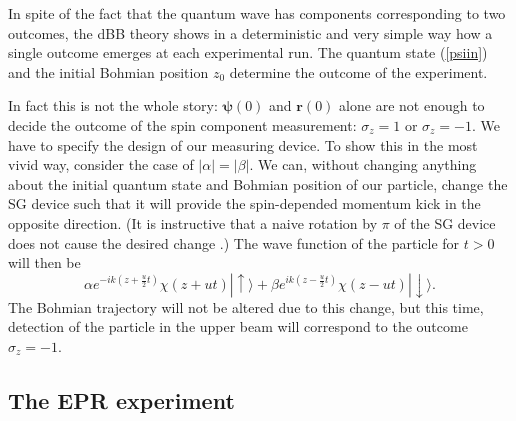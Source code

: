 \documentclass[preprint,tightenlines]{elsarticle}
\begin{document}
In spite of the fact that the quantum wave has components corresponding
to two outcomes, the dBB theory shows in a deterministic and very
simple way how a single outcome emerges at each experimental run.
The quantum state (\ref{psiin}) and the initial Bohmian position
$z_{0}$ determine the outcome of the experiment.

In fact this is not the whole story: $\boldsymbol{\psi}(0)$ and $\mathbf{r}(0)$
alone are not enough to decide the outcome of the spin component measurement:
$\sigma_{z}=1$ or $\sigma_{z}=-1$. We have to specify the design
of our measuring device. To show this in the most vivid way,  consider the case of $|\alpha|=|\beta|$. We can, without changing anything about the
initial quantum state and Bohmian position of our particle, change the SG device such that it will provide the  spin-depended momentum kick
in the opposite direction. (It is instructive that a naive rotation by $\pi$ of the SG device does not cause the desired change \cite{Ghirardi}.) The wave function of the particle for $t>0$
will then be
 \begin{equation}
\alpha e^{-ik(z+\frac{u}{2}t)}\chi(z+ut)|\uparrow\rangle+\beta e^{ik(z-\frac{u}{2}t)}\chi(z-ut)|\downarrow\rangle.\label{psioutnox+}
\end{equation}
 The Bohmian trajectory will not be altered due to this change,
but this time, detection of the particle in the upper beam will correspond
to the outcome $\sigma_{z}=-1$.


\subsection{ The EPR experiment}
\end{document}
